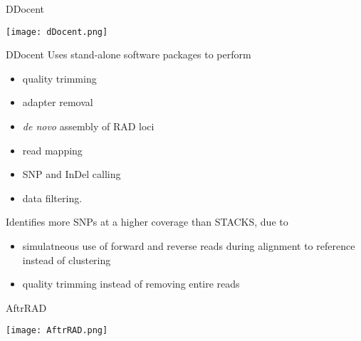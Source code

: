 \documentclass[presentation]{beamer}
\begin{document}
\begin{frame}[label={sec:org4d44083}]{DDocent \citep{Puritz2014}}
\begin{latex}
\begin{center}
\end{latex}

\begin{center}
\texttt{[image: dDocent.png]}
\end{center}

\begin{latex}
\end{center}
\end{latex}
\end{frame}

\begin{frame}[label={sec:org0055dcf}]{DDocent \citep{Puritz2014}}
Uses stand-alone software packages to perform
\begin{itemize}
\item quality trimming
\item adapter removal
\item \emph{de novo} assembly of RAD loci
\item read mapping
\item SNP and InDel calling
\item data filtering.
\end{itemize}

Identifies more SNPs at a higher coverage than STACKS, due to 
\begin{itemize}
\item simulatneous use of forward and reverse reads during alignment to
reference instead of clustering
\item quality trimming instead of removing entire reads
\end{itemize}
\end{frame}




\begin{frame}[label={sec:org535457d}]{AftrRAD}
\begin{latex}
\begin{center}
\end{latex}

\begin{center}
\texttt{[image: AftrRAD.png]}
\end{center}

\begin{latex}
\end{center}
\end{latex}
\end{frame}
\end{document}
